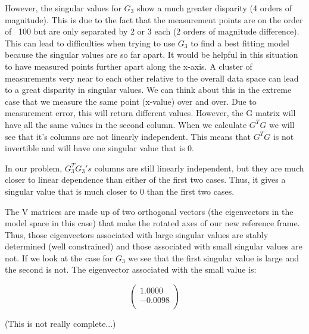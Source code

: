 \documentclass[11pt]{article}
\begin{document}
However, the singular values for $G_3$ show a much greater disparity (4 orders of magnitude).  This is due to the fact that the measurement points are on the order of ~100 but are only separated by 2 or 3 each (2 orders of magnitude difference).  This can lead to difficulties when trying to use $G_3$ to find a best fitting model because the singular values are so far apart.  It would be helpful in this situation to have measured points further apart along the x-axis.  A cluster of measurements very near to each other relative to the overall data space can lead to a great disparity in singular values.  We can think about this in the extreme case that we measure the same point (x-value) over and over.  Due to measurement error, this will return different values.  However, the G matrix will have all the same values in the second column.  When we calculate $G^T G$ we will see that it's columns are not linearly independent.  This means that $G^T G$ is not invertible and will have one singular value that is 0.

In our problem, $G_3^T G_3's$ columns are still linearly independent, but they are much closer to linear dependence than either of the first two cases.  Thus, it gives a singular value that is much closer to 0 than the first two cases.

The V matrices are made up of two orthogonal vectors (the eigenvectors in the model space in this case) that make the rotated axes of our new reference frame.  Thus, those eigenvectors associated with large singular values are stably determined (well constrained) and those associated with small singular values are not.  If we look at the case for $G_3$ we see that the first singular value is large and the second is not.  The eigenvector associated with the small value is:

\begin{equation}
\begin{pmatrix}
    1.0000 \\
   -0.0098 \\
\end{pmatrix}
\end{equation}

(This is not really complete...)
\end{document}
